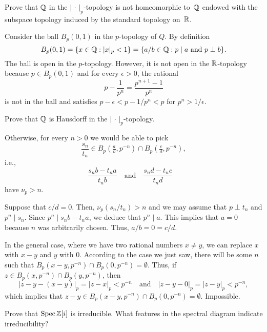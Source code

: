 \begin{exr}
    Prove that\/ $\mathbb{Q}$ in the\/ $|\,\cdot\,|_p$-topology is not homeomorphic to\/~$\mathbb{Q}$ endowed with the subspace topology induced by the standard topology on\/~$\mathbb{R}$.
\end{exr}

\begin{solution}
    Consider the ball $B_p(0,1)$ in the $p$-topology of $Q$. By definition
    $$
        B_p(0,1) = \{x\in\mathbb{Q}:|x|_p<1\}
            = \{a/b\in\mathbb{Q}: p\mid a\text{ and }p\perp b\}.
    $$
    The ball is open in the $p$-topology. However, it is not open in the $\mathbb{R}$-topology because $p\in B_p(0,1)$ and for every $\epsilon>0$, the rational
    $$
        p-\frac1{p^n}=\frac{p^{n+1}-1}{p^n}
    $$
    is not in the ball and satisfies $p-\epsilon<p-1/p^n<p$ for $p^n>1/\epsilon$.
\end{solution}

\begin{exr}
    Prove that\/ $\mathbb{Q}$ is Hausdorff in the\/ $|\,\cdot\,|_p$-topology.
\end{exr}

\begin{solution}
    Otherwise, for every $n>0$ we would be able to pick
    $$
        \frac{s_n}{t_n}\in B_p(\tfrac ab,p^{-n})\cap B_p(\tfrac cd,p^{-n}),
    $$
    i.e.,
    $$
        \frac{s_nb-t_na}{t_nb}\quad\text{and}\quad
            \frac{s_nd-t_nc}{t_nd}\quad
    $$
    have $\nu_p>n$.
    
    Suppose that $c/d=0$. Then, $\nu_p(s_n/t_n)>n$ and we may assume that $p\perp t_n$ and $p^n\mid s_n$. Since $p^n\mid s_nb-t_na$, we deduce that $p^n\mid a$. This implies that $a=0$ because $n$ was arbitrarily chosen. Thus, $a/b=0=c/d$.

    In the general case, where we have two rational numbers $x\ne y$, we can replace $x$ with $x-y$ and $y$ with $0$. According to the case we just saw, there will be some $n$ such that $B_p(x-y,p^{-n})\cap B_p(0,p^{-n})=\emptyset$. Thus, if $z\in B_p(x,p^{-n})\cap B_p(y,p^{-n})$, then
    $$
        |z-y-(x-y)|_p = |z-x|_p < p^{-n}\quad
            \text{and}\quad
            |z-y-0|_p = |z-y|_p < p^{-n},
    $$
    which implies that $z-y\in B_p(x-y,p^{-n})\cap B_p(0,p^{-n})=\emptyset$. Impossible.
\end{solution}

\begin{exr}
    Prove that\/ $\operatorname{Spec}\mathbb{Z}[i]$ is irreducible. What features in the spectral diagram indicate irreducibility?
\end{exr}

